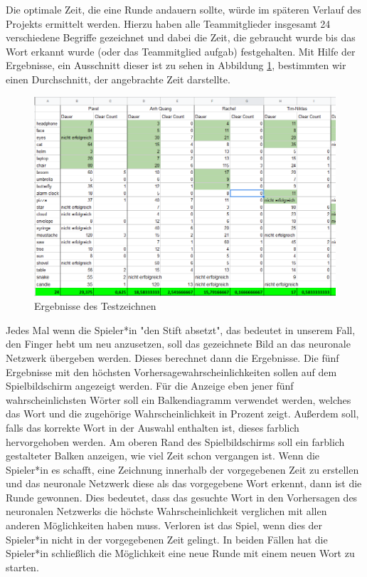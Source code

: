 \documentclass[11pt]{article}
\begin{document}
Die optimale Zeit, die eine Runde andauern sollte, würde im späteren Verlauf des Projekts ermittelt werden. Hierzu haben alle Teammitglieder insgesamt 24 verschiedene Begriffe gezeichnet und dabei die Zeit, die gebraucht wurde bis das Wort erkannt wurde (oder das Teammitglied aufgab) festgehalten. Mit Hilfe der Ergebnisse, ein Ausschnitt dieser ist zu sehen in Abbildung \ref{fig:testResults}, bestimmten wir einen Durchschnitt, der angebrachte Zeit darstellte. 

\label{chap:spielkonzept}
\begin{figure}[ht]
\centering
\includegraphics[width=1\textwidth]{images/blindtesting.png}
\caption{\label{fig:testResults}Ergebnisse des Testzeichnen}
\end{figure}

Jedes Mal wenn die Spieler*in "den Stift absetzt", das bedeutet in unserem Fall, den Finger hebt um neu anzusetzen, soll das gezeichnete Bild an das neuronale Netzwerk übergeben werden. Dieses berechnet dann die Ergebnisse. Die fünf Ergebnisse mit den höchsten Vorhersagewahrscheinlichkeiten sollen auf dem Spielbildschirm angezeigt werden. Für die Anzeige eben jener fünf wahrscheinlichsten Wörter soll ein Balkendiagramm verwendet werden, welches das Wort und die zugehörige Wahrscheinlichkeit in Prozent zeigt. Außerdem soll, falls das korrekte Wort in der Auswahl enthalten ist, dieses farblich hervorgehoben werden. Am oberen Rand des Spielbildschirms soll ein farblich gestalteter Balken anzeigen, wie viel Zeit schon vergangen ist. Wenn die Spieler*in es schafft, eine  Zeichnung innerhalb der vorgegebenen Zeit zu erstellen und das neuronale Netzwerk diese als das vorgegebene Wort erkennt, dann ist die Runde gewonnen. Dies bedeutet, dass das gesuchte Wort in den Vorhersagen des neuronalen Netzwerks die höchste Wahrscheinlichkeit verglichen mit allen anderen Möglichkeiten haben muss. Verloren ist das Spiel, wenn dies der Spieler*in nicht in der vorgegebenen Zeit gelingt. 
In beiden Fällen hat die Spieler*in schließlich die Möglichkeit eine neue Runde mit einem neuen Wort zu starten.
\end{document}
